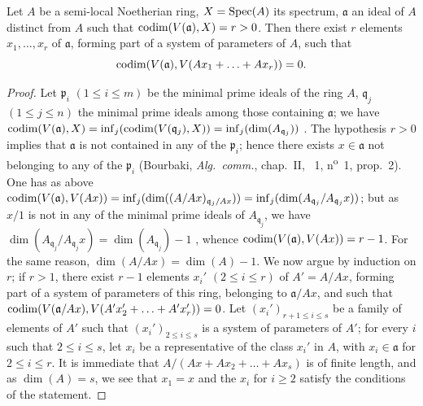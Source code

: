 
\begin{proposition}[16.3.8]
\label{0.16.3.8}
Let $A$ be a semi-local Noetherian ring, $X=\operatorname{Spec}(A)$ its spectrum, $\mathfrak{a}$ an ideal of $A$ distinct from $A$ such that $\operatorname{codim}(V(\mathfrak{a}),X)=r>0$.
Then there exist $r$ elements $x_1,\ldots,x_r$ of $\mathfrak{a}$, forming part of a system of parameters of $A$, such that
\[
  \operatorname{codim}(V(\mathfrak{a}),V(Ax_1+\ldots+Ax_r))=0.
\]
\end{proposition}

\begin{proof}
Let $\mathfrak{p}_i$ $(1\leq i\leq m)$ be the minimal prime ideals of the ring $A$, $\mathfrak{q}_j$ $(1\leq j\leq n)$ the minimal prime ideals among those containing $\mathfrak{a}$; we have  $\operatorname{codim}(V(\mathfrak{a}),X)=\inf_j(\operatorname{codim}(V(\mathfrak{q}_j),X))=\inf_j(\dim(A_{\mathfrak{q}_j}))$ .
The hypothesis $r>0$ implies that $\mathfrak{a}$ is not contained in any of the $\mathfrak{p}_i$; hence there exists $x\in\mathfrak{a}$ not belonging to any of the $\mathfrak{p}_i$ (Bourbaki, \emph{Alg.~comm.}, chap.~II, \textsection~1, n\textsuperscript{o}~1, prop.~2).
One has as above $\operatorname{codim}(V(\mathfrak{a}),V(Ax))=\inf_j(\dim((A/Ax)_{\mathfrak{q}_j/Ax}))=\inf_j(\dim(A_{\mathfrak{q}_j}/A_{\mathfrak{q}_j}x))$; but as $x/1$ is not in any of the minimal prime ideals of $A_{\mathfrak{q}_j}$, we have $\dim(A_{\mathfrak{q}_j}/A_{\mathfrak{q}_j}x)=\dim(A_{\mathfrak{q}_j})-1$ , whence $\operatorname{codim}(V(\mathfrak{a}),V(Ax))=r-1$.
For the same reason, $\dim(A/Ax)=\dim(A)-1$.
We now argue by induction on $r$; if $r>1$, there exist $r-1$ elements $x_i'$ $(2\leq i\leq r)$ of $A'=A/Ax$, forming part of a system of parameters of this ring, belonging to $\mathfrak{a}/Ax$, and such that $\operatorname{codim}(V(\mathfrak{a}/Ax),V(A'x_2'+\ldots+A'x_r'))=0$.
Let $(x_i')_{r+1\leq i\leq s}$ be a family of elements of $A'$ such that $(x_i')_{2\leq i\leq s}$ is a system of parameters of $A'$; for every $i$ such that $2\leq i\leq s$, let $x_i$ be a representative of the class $x_i'$ in $A$, with $x_i\in\mathfrak{a}$ for $2\leq i\leq r$. It is immediate that $A/(Ax+Ax_2+\ldots+Ax_s)$ is of finite length, and as $\dim(A)=s$, we see that $x_1=x$ and the $x_i$ for $i\geq 2$ satisfy the conditions of the statement.
\end{proof}

